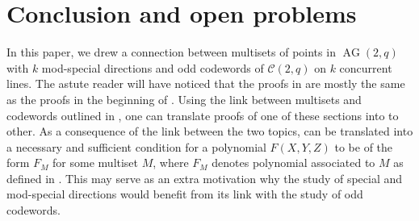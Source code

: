 \documentclass[12pt, a4paper]{article}
\theoremstyle{definition}
\newcommand{\mc}{\mathcal C}
\DeclareMathOperator{\AG}{AG}
\newcommand{\ag}{\AG}
\begin{document}
\section{Conclusion and open problems}
 \label{Sec:Conclusion}

In this paper, we drew a connection between multisets of points in $\ag(2,q)$ with $k$ mod-special directions and odd codewords of $\mc(2,q)$ on $k$ concurrent lines.
The astute reader will have noticed that the proofs in  are mostly the same as the proofs in the beginning of .
Using the link between multisets and codewords outlined in , one can translate proofs of one of these sections into to other.
As a consequence of the link between the two topics,  can be translated into a necessary and sufficient condition for a polynomial $F(X,Y,Z)$ to be of the form $F_M$ for some multiset $M$, where $F_M$ denotes polynomial associated to $M$ as defined in .
This may serve as an extra motivation why the study of special and mod-special directions would benefit from its link with the study of odd codewords.

\bigskip
\end{document}
